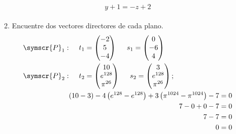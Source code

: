 \documentclass{article}
\def\fancyP{\symscr{P}}
\begin{document}
\begin{enumerate}
\begin{enumerate}[label=\listAlph]
\[\begin{aligned}
\begin{aligned}
                        y + 1
                        =
                        -z + 2
                    \end{aligned}
                \end{aligned}
            \]
		\item Encuentre dos vectores directores de cada plano.
            \[
                \begin{aligned}
                    \fancyP_1:&
                    \hspace{0.5cm}
                    t_1 = \begin{pmatrix}
                        -2 \\ 5 \\ -4
                    \end{pmatrix}
                    \hspace{0.5cm}
                    s_1 = \begin{pmatrix}   
                        0 \\ -6 \\ 4
                    \end{pmatrix}
                    \\
                    \fancyP_2:&
                    \hspace{0.5cm}
                    t_2 = \begin{pmatrix}
                        10 \\ e^{128} \\ \pi^{26}
                    \end{pmatrix}
                    \hspace{0.5cm}
                    s_2 = \begin{pmatrix}
                        3 \\ e^{128} \\ \pi^{26}
                    \end{pmatrix};
                    \\
                    &\begin{aligned}
                        \left(10 - 3\right) - 4\left(e^{128} - e^{128}\right) + 3\left(\pi^{1024} - \pi^{1024}\right) - 7 &= 0 \\
                        7 - 0 + 0 - 7 &= 0\\
                        7 - 7 &= 0 \\
                        0 &= 0 \\
                    \end{aligned}

\end{aligned}\]
\end{enumerate}
\end{enumerate}
\end{document}
